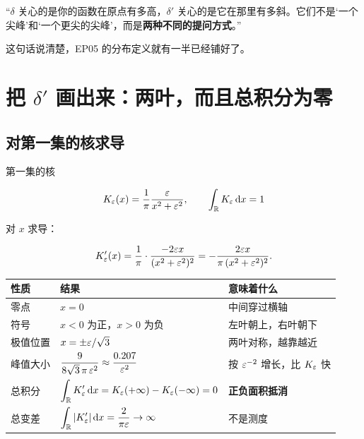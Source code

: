 \begin{ideabox}[一句可以直接用的旁白]
“$\delta$ 关心的是你的函数在原点有多高，$\delta'$ 关心的是它在那里有多斜。它们不是‘一个尖峰’和‘一个更尖的尖峰’，而是\textbf{两种不同的提问方式}。”

这句话说清楚，EP05 的分布定义就有一半已经铺好了。
\end{ideabox}

\section{把 $\delta'$ 画出来：两叶，而且总积分为零}

\subsection{对第一集的核求导}

第一集的核

\begin{equation}
K_\varepsilon(x)=\frac{1}{\pi}\frac{\varepsilon}{x^{2}+\varepsilon^{2}},
\qquad
\int_{\mathbb{R}}K_\varepsilon\mathop{}\!\mathrm{d} x=1
\end{equation}

对 $x$ 求导：

\begin{equation}
K_\varepsilon'(x)=\frac{1}{\pi}\cdot\frac{-2\varepsilon x}{(x^{2}+\varepsilon^{2})^{2}}
=-\frac{2\varepsilon x}{\pi\,(x^{2}+\varepsilon^{2})^{2}} .\label{eq:Keps-prime}
\end{equation}

\begin{center}
\small
\renewcommand{\arraystretch}{1.35}
\begin{tabularx}{\textwidth}{@{}L{4.0cm}L{4.6cm}Y@{}}
\toprule
性质 & 结果 & 意味着什么 \\
\midrule
零点 & $x=0$ & 中间穿过横轴 \\
符号 & $x<0$ 为正，$x>0$ 为负 & 左叶朝上，右叶朝下 \\
极值位置 & $x=\pm\varepsilon/\sqrt{3}$ & 两叶对称，越靠越近 \\
峰值大小 & $\dfrac{9}{8\sqrt{3}\,\pi\,\varepsilon^{2}}\approx\dfrac{0.207}{\varepsilon^{2}}$ & 按 $\varepsilon^{-2}$ 增长，比 $K_\varepsilon$ 快 \\
总积分 & $\displaystyle\int_{\mathbb{R}}K_\varepsilon'\mathop{}\!\mathrm{d} x=K_\varepsilon(+\infty)-K_\varepsilon(-\infty)=0$ & \textbf{正负面积抵消} \\
总变差 & $\displaystyle\int_{\mathbb{R}}|K_\varepsilon'|\mathop{}\!\mathrm{d} x=\frac{2}{\pi\varepsilon}\to\infty$ & 不是测度 \\
\bottomrule
\end{tabularx}
\end{center}

